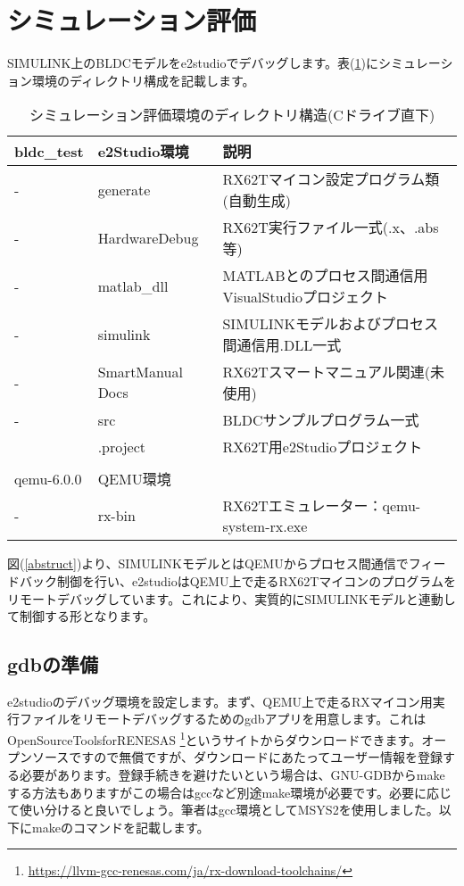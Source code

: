 \newpage
\section{シミュレーション評価}
SIMULINK上のBLDCモデルをe2studioでデバッグします。表(\ref{RX62T-TestDirectory})にシミュレーション環境のディレクトリ構成を記載します。
{\small
\begin{table}[htbp!]
\centering
\caption{シミュレーション評価環境のディレクトリ構造(Cドライブ直下)}
\label{RX62T-TestDirectory}
\begin{tabular}{|l|l|l|}
\hline
bldc\_test & e2Studio環境       & 説明                                 \\ \hline
-          & generate         & RX62Tマイコン設定プログラム類(自動生成)            \\ \hline
-          & HardwareDebug    & RX62T実行ファイル一式(.x、.abs等)            \\ \hline
-          & matlab\_dll      & MATLABとのプロセス間通信用VisualStudioプロジェクト \\ \hline
-          & simulink         & SIMULINKモデルおよびプロセス間通信用.DLL一式       \\ \hline
-          & SmartManual Docs & RX62Tスマートマニュアル関連(未使用)              \\ \hline
-          & src              & BLDCサンプルプログラム一式                    \\ \hline
           & .project         & RX62T用e2Studioプロジェクト               \\ \hline
           &                  &                                    \\ \hline
qemu-6.0.0 & QEMU環境           &                                    \\ \hline
-          & rx-bin           & RX62Tエミュレーター：qemu-system-rx.exe    \\ \hline
\end{tabular}
\end{table}
}

図(\ref{abstruct})より、SIMULINKモデルとはQEMUからプロセス間通信でフィードバック制御を行い、e2studioはQEMU上で走るRX62Tマイコンのプログラムをリモートデバッグしています。これにより、実質的にSIMULINKモデルと連動して制御する形となります。
\subsection{gdbの準備}
e2studioのデバッグ環境を設定します。まず、QEMU上で走るRXマイコン用実行ファイルをリモートデバッグするためのgdbアプリを用意します。これはOpenSourceToolsforRENESAS
\footnote{\href{https://llvm-gcc-renesas.com/ja/rx-download-toolchains/}{\underline{https://llvm-gcc-renesas.com/ja/rx-download-toolchains/}}}というサイトからダウンロードできます。オープンソースですので無償ですが、ダウンロードにあたってユーザー情報を登録する必要があります。登録手続きを避けたいという場合は、GNU-GDBからmakeする方法もありますがこの場合はgccなど別途make環境が必要です。必要に応じて使い分けると良いでしょう。筆者はgcc環境としてMSYS2を使用しました。以下にmakeのコマンドを記載します。
